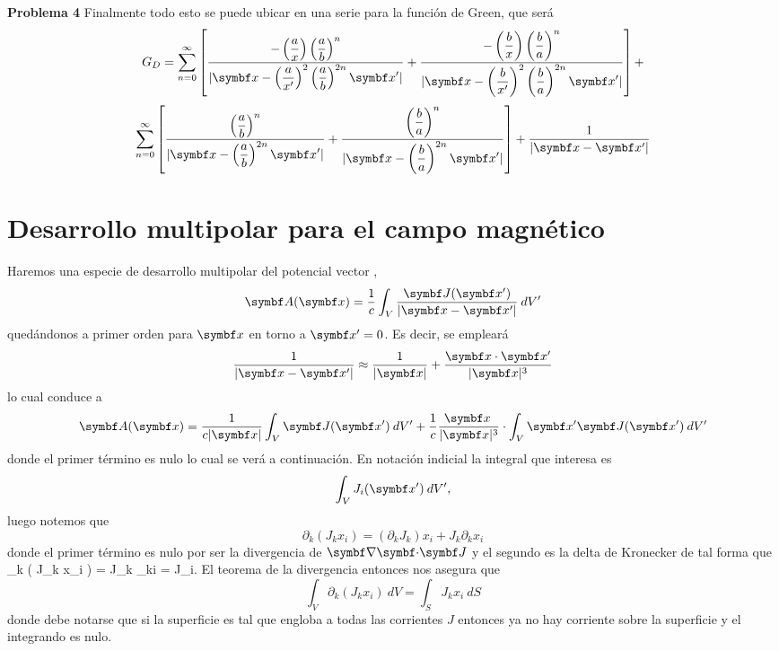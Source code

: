 \documentclass[10pt,oneside]{CBFT_book}
\begin{document}
\begin{ejemplo}{\bf Problema 4}
Finalmente todo esto se puede ubicar en una serie para la función de Green, que será
\[
	G_D = \sum_{n=0}^\infty \left[ \frac{\displaystyle - \Frac{a}{x}\Frac{a}{b}^n }
	{ \displaystyle | \vbx - \Frac{a}{x'}^2\Frac{a}{b}^{2n} \vbx'|} + 
	\frac{\displaystyle - \Frac{b}{x}\Frac{b}{a}^n }
	{ \displaystyle | \vbx - \Frac{b}{x'}^2\Frac{b}{a}^{2n} \vbx'|} \right] + 
\]
\[
	\sum_{n=0}^\infty \left[ \frac{\displaystyle \Frac{a}{b}^n }
	{ \displaystyle | \vbx - \Frac{a}{b}^{2n} \vbx'|} + 
	\frac{\displaystyle \Frac{b}{a}^n }
	{ \displaystyle | \vbx - \Frac{b}{a}^{2n} \vbx'|} \right] +
	\frac{1}{|\vbx -\vbx'|}
\]

 
\end{ejemplo}

\section{Desarrollo multipolar para el campo magnético}

Haremos una especie de desarrollo multipolar del potencial vector ,
\[
	\vb{A}(\vb{x}) = \frac{1}{c} \int_V \frac{\vb{J}(\vb{x}')}{|\vb{x}-\vb{x}'|} \: dV' 
\]
quedándonos a primer orden para $\vbx$ en torno a $\vb{x}'=0$. Es decir, se empleará
\[
	\frac{1}{|\vb{x}-\vb{x}'|} \approx \frac{1}{|\vb{x}|}  + \frac{\vb{x}\cdot\vb{x}'}{|\vb{x}|^3} 
\]
lo cual conduce a
\[
	\vb{A}(\vb{x}) = \frac{1}{c|\vb{x}|} \int_V \vb{J}(\vb{x}') \: dV' 
	+ \frac{1}{c} \frac{ \vb{x} \: }{|\vb{x}|^3} \cdot \int_V \vb{x}' \vb{J}(\vb{x}') \: dV' 
\]
donde el primer término es nulo lo cual se verá a continuación. En notación indicial la integral
que interesa es 
\[
	\int_V J_i (\vb{x}') \: dV',
\]
luego notemos que 
\[
	\partial_k ( J_k x_i ) = ( \partial_k  J_k ) x_i + J_k \partial_k x_i 
\]
donde el primer término es nulo por ser la divergencia de $\divem{J}$ y el segundo es la delta
de Kronecker de tal forma que
\be
	\partial_k ( J_k x_i ) = J_k \delta_{ki} = J_i. 
	\label{expresion_J}
\ee
El teorema de la divergencia entonces nos asegura que
\[
	\int_V \partial_k ( J_k x_i ) \: dV = \int_S J_k x_i \: dS
\]
donde debe notarse que si la superficie es tal que engloba a todas las corrientes $J$ entonces
ya no hay corriente sobre la superficie y el integrando es nulo.
\end{document}
